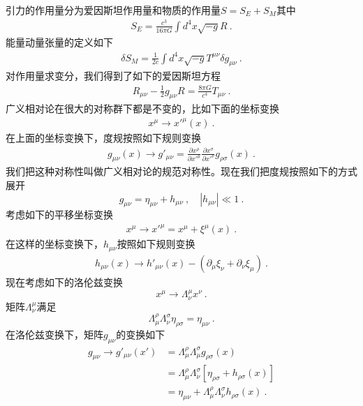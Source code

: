 引力的作用量分为爱因斯坦作用量和物质的作用量$S=S_E+S_M$其中
\begin{align}
S_E = \frac{c^3}{16\pi G} \int d^4 x \sqrt{-g} R~.
\end{align}
能量动量张量的定义如下
\begin{align}
\delta S_M = \frac{1}{2 c} \int d^4 x \sqrt{-g} T^{\mu\nu} \delta g_{\mu\nu} ~. 
\end{align}
对作用量求变分，我们得到了如下的爱因斯坦方程
\begin{align}
R_{\mu\nu} - \frac{1}{2} g_{\mu\nu} R = \frac{8\pi G}{c^4} T_{\mu\nu} ~. 
\end{align}
广义相对论在很大的对称群下都是不变的，比如下面的坐标变换
\begin{align}
x^\mu \rightarrow x'^\mu (x) ~. 
\end{align}
在上面的坐标变换下，度规按照如下规则变换
\begin{align}
g_{\mu\nu} (x) \rightarrow g'_{\mu\nu}  = \frac{\partial x^\rho}{\partial x'^\mu} \frac{\partial x^\sigma}{\partial x'^\nu} g_{\rho\sigma} (x) ~. 
\end{align}
我们把这种对称性叫做广义相对论的规范对称性。现在我们把度规按照如下的方式展开
\begin{equation}\label{Geomet_eq1}
g_{\mu\nu} = \eta_{\mu\nu} + h_{\mu\nu}~, \quad |h_{\mu\nu}| \ll 1 ~. 
\end{equation} 
考虑如下的平移坐标变换
\begin{align}
x^\mu \rightarrow x'^\mu = x^\mu + \xi^\mu (x) ~. 
\end{align}
在这样的坐标变换下，$h_{\mu\nu}$按照如下规则变换
\begin{align}
h_{\mu\nu} (x) \rightarrow h'_{\mu\nu} (x) - (\partial_\mu\xi_\nu+\partial_\nu \xi_\mu) ~.
\end{align}
现在考虑如下的洛伦兹变换
\begin{equation}
x^\mu \rightarrow \Lambda^\mu_\nu x^\nu ~.
\end{equation}
矩阵$\Lambda^\mu_\nu$满足
\begin{equation}
\Lambda^\rho_\mu\Lambda^\sigma_\nu \eta_{\rho\sigma} = \eta_{\mu\nu} ~. 
\end{equation}
在洛伦兹变换下，矩阵$g_{\mu\nu}$的变换如下
\begin{align}\nonumber
g_{\mu\nu} \rightarrow g'_{\mu\nu} (x') & = \Lambda^\rho_\mu \Lambda^\sigma_\mu g_{\rho\sigma} (x) \\\nonumber
& = \Lambda^\rho_\mu \Lambda^\sigma_\nu [\eta_{\rho\sigma} + h_{\rho\sigma}(x)] \\
& = \eta_{\mu\nu} + \Lambda^\rho_\mu \Lambda^\sigma_\nu h_{\rho\sigma} (x) ~.
\end{align}
